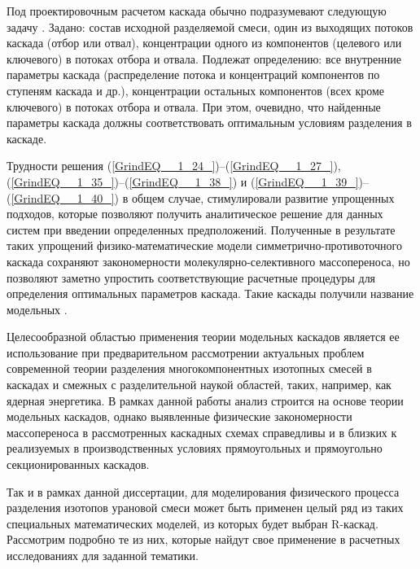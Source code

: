 Под проектировочным расчетом каскада обычно подразумевают следующую задачу \cite{sulaberidzeTeoriyaKaskadovDlya2011}.
Задано: состав исходной разделяемой смеси, один из выходящих потоков каскада (отбор или отвал), концентрации одного из компонентов (целевого или ключевого) в потоках отбора и отвала.
Подлежат определению: все внутренние параметры каскада (распределение потока и концентраций компонентов по ступеням каскада и др.), концентрации остальных компонентов (всех кроме ключевого) в потоках отбора и отвала. 
При этом, очевидно, что найденные параметры каскада должны соответствовать оптимальным условиям разделения в каскаде.

Трудности решения (\ref{GrindEQ__1_24_})--(\ref{GrindEQ__1_27_}), (\ref{GrindEQ__1_35_})--(\ref{GrindEQ__1_38_}) и (\ref{GrindEQ__1_39_})--(\ref{GrindEQ__1_40_}) в общем случае, стимулировали развитие упрощенных подходов, которые позволяют получить аналитическое решение для данных систем при введении определенных предположений. Полученные в результате таких упрощений физико-математические модели симметрично-противоточного каскада сохраняют закономерности молекулярно-селективного массопереноса, но позволяют заметно упростить соответствующие расчетные процедуры для определения оптимальных параметров каскада. Такие каскады получили название модельных \cite{minenkoTeoriiKaskadovDlya1965, delagarzaMulticomponentIsotopeSeparation1961, zhigalovskiyLekcionnyeMaterialyPo1999, kolokoltsovDesignCascadesSeparating1970, kolokolcovVoprosuPostroeniiKaskadov1970, minenkoPredelnoeObogashcheniePromezhutochnyh1972, yamamotoMulticomponentIsotopeSeparating1978, wuStudyMulticomponentIsotope, borisevichRascheteKaskadovDopolnitelnym1993, woodCriterionEffiencyMultiisotope1999, sulaberidzeOsobennostiObogashcheniyaKomponentov2006, sazykinKvaziidealnyeKaskadyDlya2000, sulaberidzeSravnenieOptimalnyhModelnyh2008}.

Целесообразной областью применения теории модельных каскадов является ее использование при предварительном рассмотрении актуальных проблем современной теории разделения многокомпонентных изотопных смесей в каскадах и смежных с разделительной наукой областей, таких, например, как ядерная энергетика. В рамках данной работы анализ строится на основе теории модельных каскадов, однако выявленные физические закономерности массопереноса в рассмотренных каскадных схемах справедливы и в близких к реализуемых в производственных условиях прямоугольных и прямоугольно секционированных каскадов.

Так и в рамках данной диссертации, для моделирования физического процесса разделения изотопов урановой смеси может быть применен целый ряд из таких специальных математических моделей, из которых будет выбран R-каскад. Рассмотрим подробно те из них, которые найдут свое применение в расчетных исследованиях для заданной тематики.

